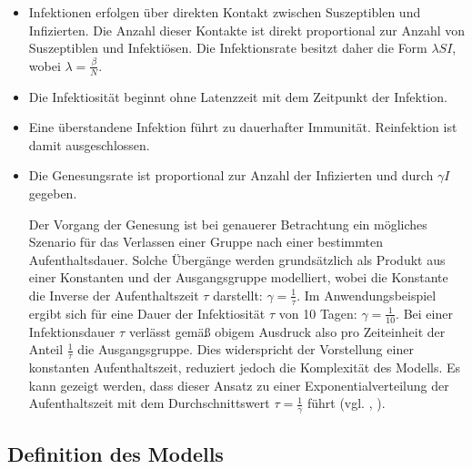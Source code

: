 \documentclass[../main.tex]{subfiles}
\begin{document}
    \begin{itemize}
      \item Infektionen erfolgen über direkten Kontakt zwischen Suszeptiblen und Infizierten. Die Anzahl dieser Kontakte ist direkt proportional zur Anzahl von Suszeptiblen und Infektiösen.
      Die Infektionsrate besitzt daher die Form $\lambda S I$, wobei $\lambda = \frac{\beta}{N}$.

      \item Die Infektiosität beginnt ohne Latenzzeit mit dem Zeitpunkt der Infektion.
      
      \item Eine überstandene Infektion führt zu dauerhafter Immunität. Reinfektion ist damit ausgeschlossen.

      \item Die Genesungsrate ist proportional zur Anzahl der Infizierten und durch $\gamma I$ gegeben.
      
      Der Vorgang der Genesung ist bei genauerer Betrachtung ein mögliches Szenario für das Verlassen einer Gruppe nach einer bestimmten Aufenthaltsdauer. Solche Übergänge werden grundsätzlich als Produkt aus einer Konstanten und der Ausgangsgruppe modelliert, wobei die Konstante die Inverse der Aufenthaltszeit $\tau$ darstellt: $\gamma = \frac{1}{\tau}$. Im Anwendungsbeispiel ergibt sich für eine Dauer der Infektiosität $\tau$ von 10 Tagen: $\gamma=\frac{1}{10}$.
      Bei einer Infektionsdauer $\tau$ verlässt gemäß obigem Ausdruck also pro Zeiteinheit der Anteil $\frac{1}{\tau}$ die Ausgangsgruppe. Dies widerspricht der Vorstellung einer konstanten Aufenthaltszeit, reduziert jedoch die Komplexität des Modells. Es kann gezeigt werden, dass dieser Ansatz zu einer Exponentialverteilung der Aufenthaltszeit mit dem Durchschnittswert $\tau = \frac{1}{\gamma}$ führt (vgl. \cite[S. 88]{Bri03}, \cite[S. 14]{Li18}).

    \end{itemize}

    \subsection{Definition des Modells}
    \label{ssec:definition1}
\end{document}
